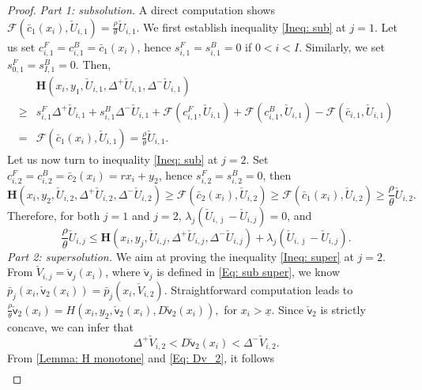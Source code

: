 \documentclass[11pt]{article}
\numberwithin{equation}{section}
\numberwithin{algorithm}{section}
\newcommand{\lc}{\left(}
\newcommand{\rc}{\right)}
\def\su{{\mathsf{u}}}
\def\sv{{\mathsf{v}}}
\newcommand{\ux}{{\underline x}}
\newcommand{\beq}{\begin{equation}}
\newcommand{\eeq}{\end{equation}}
\theoremstyle{plain}
\newcommand{\D}{\Delta}
\begin{document}
\begin{proof}
{\it{Part 1: subsolution.}} A direct computation shows $\mathcal{F}\lc \bar{c}_{1}(x_i),\check{U}_{i,1}\rc=\frac{\rho}{\theta}\check{U}_{i,1}$. We first establish inequality \cref{Ineq: sub} at $j=1$.
Let us set $c^F_{i,1}=c^B_{i,1}=\bar{c}_1(x_i)$, hence $s^F_{i,1}=s^B_{i,1}=0$ if $0<i<I$. Similarly, we set $s^F_{0,1}=s^B_{I,1}=0$. Then,
\begin{align*}
&\boldsymbol{H}\lc x_i,y_1,\check{U}_{i,1},\D^+{\check{U}_{i,1}},\D^-{\check{U}_{i,1}}\rc\\
\geq  {}& s^F_{i,1}\D^+{\check{U}_{i,1}}+s^B_{i,1}\D^-{\check{U}_{i,1}}+\mathcal{F}\lc c^F_{i,1},\check{U}_{i,1}\rc+\mathcal{F}\lc c^B_{i,1},\check{U}_{i,1}\rc-\mathcal{F}\lc \bar{c}_{i,1},\check{U}_{i,1}\rc\\
={}&\mathcal{F}\lc \bar{c}_{1}(x_i),\check{U}_{i,1}\rc=\frac{\rho}{\theta}\check{U}_{i,1}.
\end{align*}
 Let us now turn to inequality \cref{Ineq: sub} at $j=2$. Set $c^F_{i,2}=c^B_{i,2}=\bar{c}_2(x_i)=rx_i+y_2$, hence $s^F_{i,2}=s^B_{i,2}=0$, then
$$
\boldsymbol{H}\lc x_i,y_2,\check{U}_{i,2},\D^+{\check{U}_{i,2}},\D^-{\check{U}_{i,2}}\rc\geq \mathcal{F}\lc \bar{c}_{2}(x_i),\check{U}_{i,2}\rc\geq \mathcal{F}\lc \bar{c}_{1}(x_i),\check{U}_{i,2}\rc\geq \frac{\rho}{\theta}\check{U}_{i,2}.
$$
Therefore, for both $j=1$ and $j=2$, $\lambda_j(\check{U}_{i,\bar \jmath}-\check{U}_{i,j})=0$, and 
$$
\frac{\rho}{\theta} \check{U}_{i,j}\leq \boldsymbol{H}\lc x_i,y_j,\check{U}_{i,j},\D^+{\check{U}_{i,j}},\D^-{\check{U}_{i,j}}\rc+\lambda_j(\check{U}_{i,\bar \jmath}-\check{U}_{i,j}).
$$
{\it{Part 2: supersolution.}} We aim at proving the inequality \cref{Ineq: super} at $j=2$. From $\check{V}_{i,j}=\check{\sv}_{j}(x_i)$, where $\check{\sv}_{j}$ is defined in \cref{Eq: sub super}, we know $\bar{p}_{j}\lc x_i,\check{\sv}_{2}(x_i)\rc=\bar{p}_{j}\lc x_i,\check{V}_{i,2}\rc$. Straightforward computation leads to
$
\frac{\rho}{\theta}\check{\sv}_{2}(x_i)=H(x_i,y_2,\check{\sv}_{2}(x_i),D\check{\sv}_{2}(x_i)),
$
for $x_i>\ux$. Since $\check{\sv}_{2}$ is strictly concave, we can infer that
\beq\label{Eq: Dv_2}
\D^+{\check{V}_{i,2}}<D\check{\sv}_{2}(x_i)<\D^-{\check{V}_{i,2}}.
\eeq
From \cref{Lemma: H monotone} and \cref{Eq: Dv_2}, it follows
\begin{align*}

\end{align*}
\end{proof}
\end{document}
